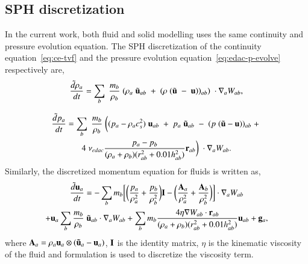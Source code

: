 \subsection{SPH discretization}\label{sec:ctvf-sph-equations}

In the current work, both fluid and solid modelling uses the same continuity
and pressure evolution equation. The SPH discretization of the continuity
equation~\eqref{eq:ce-tvf} and the pressure evolution
equation~\eqref{eq:edac-p-evolve} respectively are,
\begin{equation}
  \label{eq:sph-discretization-continuity}
  \frac{\tilde{d}\rho_a}{dt} = \sum_{b} \; \frac{m_b}{\rho_{b}} \; (
  \rho_{a} \; \tilde{\mathbf{u}}_{ab} \; + \;
  (\rho \; (\tilde{\mathbf{u}} \; - \;
  \mathbf{u}))_{ab}) \; \cdot \nabla_{a} W_{ab},
\end{equation}

\begin{multline}
  \label{eq:sph-discretization-edac}
  \frac{\tilde{d}p_a}{dt} = \sum_{b} \; \frac{m_b}{\rho_{b}} \; \bigg(
  (p_{a} - \rho_{a} c_{s}^2) \; \mathbf{u}_{ab} \; + \;
  p_{a} \; \tilde{\mathbf{u}}_{ab} \; - \;
  (p \; (\tilde{\mathbf{u}} - \mathbf{u}))_{ab} \; + \; \\
  4 \; \nu_{edac}
  \frac{p_a - p_b}{(\rho_a + \rho_b) (r^2_{ab} + 0.01 h_{ab}^{2})} \mathbf{r}_{ab}
  \bigg) \; \cdot \nabla_{a} W_{ab}.
\end{multline}
%
Similarly, the discretized momentum equation for fluids is written as,
\begin{multline}
  \label{eq:sph-momentum-fluid}
  \frac{\tilde{d}\mathbf{u}_{a}}{dt} = - \sum_{b} m_b \bigg[
  \bigg(\frac{p_a}{\rho_a^2} + \frac{p_b}{\rho_b^2}\bigg) \mathbf{I} -
  \bigg(\frac{\mathbf{A}_a}{\rho_a^2} + \frac{\mathbf{A}_b}{\rho_b^2}
  \bigg) \bigg]
  \cdot \nabla_{a} W_{ab} \\
  + \mathbf{u}_{a} \sum_{b} \frac{m_b}{\rho_{b}} \; \tilde{\mathbf{u}}_{ab} \cdot
  \nabla_{a} W_{ab} + \sum_{b} m_b \frac{4 \eta \nabla W_{ab}\cdot
    \mathbf{r}_{ab}}{(\rho_a + \rho_b) (r_{ab}^2 + 0.01 h_{ab}^2)} \mathbf{u}_{ab} +
  \mathbf{g}_{a},
\end{multline}
where $\mathbf{A}_a = \rho_a \mathbf{u}_a \otimes (\mathbf{\tilde{u}}_a - \mathbf{u}_a)$,
$\mathbf{I}$ is the identity matrix, $\eta$ is the kinematic viscosity of the
fluid and \cite{morris1997modeling} formulation is used to discretize the
viscosity term.

